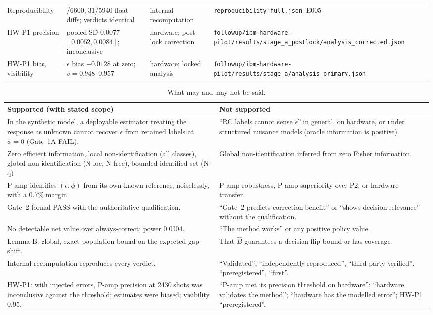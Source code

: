 \documentclass[10pt,twocolumn]{article}
\newcommand{\fn}[1]{{\small\nolinkurl{#1}}}
\theoremstyle{definition}
\theoremstyle{remark}
\newcommand{\eps}{\epsilon}
\begin{document}
\begin{table}[h]
\begin{tabularx}{\textwidth}{@{}>{\raggedright\arraybackslash}p{3.8cm}>{\raggedright\arraybackslash}X>{\raggedright\arraybackslash}p{3.4cm}>{\raggedright\arraybackslash}p{4.4cm}@{}}
Reproducibility & 416/6600, 31/5940 float diffs; verdicts identical & internal recomputation & \fn{reproducibility_full.json}, E005 \\
HW-P1 precision & pooled SD $0.0077$ $[0.0052,0.0084]$; inconclusive & hardware; post-lock correction & \fn{followup/ibm-hardware-pilot/results/stage_a_postlock/analysis_corrected.json} \\
HW-P1 bias, visibility & $\eps$ bias $-0.0128$ at zero; $v=0.948$--$0.957$ & hardware; locked analysis & \fn{followup/ibm-hardware-pilot/results/stage_a/analysis_primary.json} \\
\bottomrule
\end{tabularx}
\end{table}

\begin{table}[h]
\centering\small
\caption{What may and may not be said.}\label{tab:say}
\begin{tabularx}{\textwidth}{@{}>{\raggedright\arraybackslash}X>{\raggedright\arraybackslash}X@{}}
\toprule
Supported (with stated scope) & Not supported \\
\midrule
In the synthetic model, a deployable estimator treating the response as unknown cannot recover $\eps$ from retained labels at $\phi=0$ (Gate~1A FAIL). & ``RC labels cannot sense $\eps$'' in general, on hardware, or under structured nuisance models (oracle information is positive). \\
Zero efficient information, local non-identification (all classes), global non-identification (N-loc, N-free), bounded identified set (N-q). & Global non-identification inferred from zero Fisher information. \\
P-amp identifies $(\eps,\phi)$ from its own known reference, noiselessly, with a 0.7\% margin. & P-amp robustness, P-amp superiority over P2, or hardware transfer. \\
Gate~2 formal PASS with the authoritative qualification. & ``Gate~2 predicts correction benefit'' or ``shows decision relevance'' without the qualification. \\
No detectable net value over always-correct; power $0.0004$. & ``The method works'' or any positive policy value. \\
Lemma B: global, exact population bound on the expected gap shift. & That $\hat B$ guarantees a decision-flip bound or has coverage. \\
Internal recomputation reproduces every verdict. & ``Validated'', ``independently reproduced'', ``third-party verified'', ``preregistered'', ``first''. \\
HW-P1: with injected errors, P-amp precision at 2430 shots was inconclusive against the threshold; estimates were biased; visibility 0.95. & ``P-amp met its precision threshold on hardware''; ``hardware validates the method''; ``hardware has the modelled error''; HW-P1 ``preregistered''. \\
\bottomrule
\end{tabularx}
\end{table}
\end{document}
